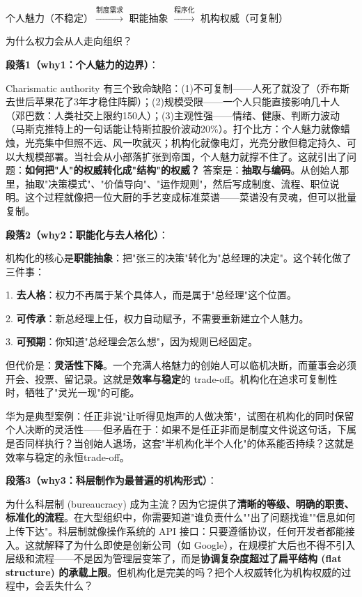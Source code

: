 \documentclass[../main.tex]{subfiles}
\begin{document}
	\begin{logicmap}

		个人魅力（不稳定）$\xrightarrow{\text{制度需求}}$ 职能抽象 $\xrightarrow{\text{程序化}}$ 机构权威（可复制）

	\end{logicmap}
	
	\begin{questionbox}

		为什么权力会从人走向组织？

	\end{questionbox}
	
	\textbf{段落1（why1：个人魅力的边界）}：  

	Charismatic authority 有三个致命缺陷：(1)不可复制——人死了就没了（乔布斯去世后苹果花了3年才稳住阵脚）；(2)规模受限——一个人只能直接影响几十人（邓巴数：人类社交上限约150人）；(3)主观性强——情绪、健康、判断力波动（马斯克推特上的一句话能让特斯拉股价波动20\%）。打个比方：个人魅力就像蜡烛，光亮集中但照不远、风一吹就灭；机构化就像电灯，光亮分散但稳定持久、可以大规模部署。当社会从小部落扩张到帝国，个人魅力就撑不住了。这就引出了问题：\textbf{如何把"人"的权威转化成"结构"的权威？} 答案是：\textbf{抽取与编码}。从创始人那里，抽取"决策模式"、"价值导向"、"运作规则"，然后写成制度、流程、职位说明。这个过程就像把一位大厨的手艺变成标准菜谱——菜谱没有灵魂，但可以批量复制。
	
	\textbf{段落2（why2：职能化与去人格化）}：  

	机构化的核心是\textbf{职能抽象}：把"张三的决策"转化为"总经理的决定"。这个转化做了三件事：  

    1. \textbf{去人格}：权力不再属于某个具体人，而是属于"总经理"这个位置。  

    2. \textbf{可传承}：新总经理上任，权力自动赋予，不需要重新建立个人魅力。  

    3. \textbf{可预期}：你知道"总经理会怎么想"，因为规则已经固定。  

    但代价是：\textbf{灵活性下降}。一个充满人格魅力的创始人可以临机决断，而董事会必须开会、投票、留记录。这就是\textbf{效率与稳定}的 trade-off。机构化在追求可复制性时，牺牲了"灵光一现"的可能。
	
	华为是典型案例：任正非说"让听得见炮声的人做决策"，试图在机构化的同时保留个人决断的灵活性——但矛盾在于：如果不是任正非而是制度文件说这句话，下属是否同样执行？当创始人退场，这套"半机构化半个人化"的体系能否持续？这就是效率与稳定的永恒trade-off。

	\textbf{段落3（why3：科层制作为最普遍的机构形式）}：  

	为什么科层制 (bureaucracy) 成为主流？因为它提供了\textbf{清晰的等级、明确的职责、标准化的流程}。在大型组织中，你需要知道"谁负责什么""出了问题找谁""信息如何上传下达"。科层制就像操作系统的 API 接口：只要遵循协议，任何开发者都能接入。这就解释了为什么即使是创新公司（如 Google），在规模扩大后也不得不引入层级和流程——不是因为管理层变笨了，而是\textbf{协调复杂度超过了扁平结构 (flat structure) 的承载上限}。但机构化是完美的吗？把个人权威转化为机构权威的过程中，会丢失什么？
	
\end{document}
